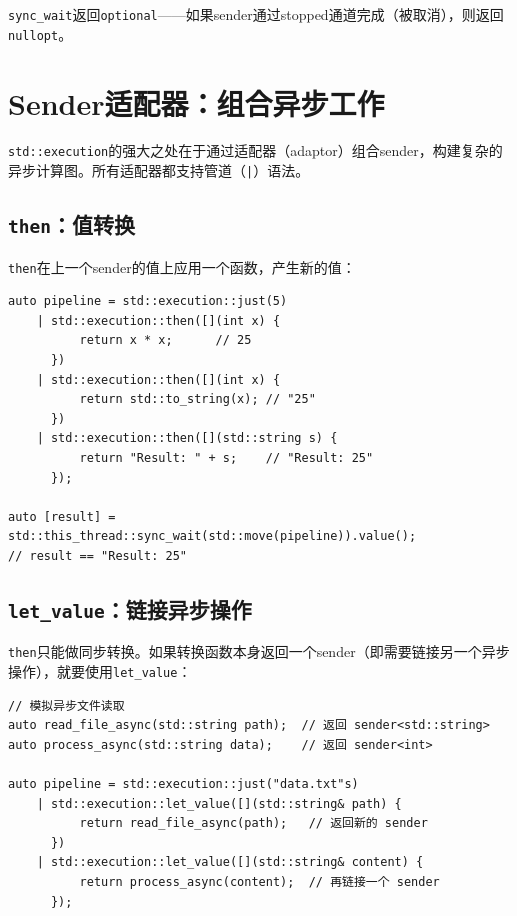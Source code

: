 \documentclass[12pt,a4paper,fontset=fandol]{ctexbook}
\begin{document}
\begin{note}
\texttt{sync\_wait}返回\texttt{optional}——如果sender通过stopped通道完成（被取消），则返回\texttt{nullopt}。
\end{note}

\chapter{Sender适配器：组合异步工作}

\texttt{std::execution}的强大之处在于通过适配器（adaptor）组合sender，构建复杂的异步计算图。所有适配器都支持管道（\texttt{|}）语法。

\section{\texttt{then}：值转换}

\texttt{then}在上一个sender的值上应用一个函数，产生新的值：

\begin{lstlisting}
auto pipeline = std::execution::just(5)
    | std::execution::then([](int x) {
          return x * x;      // 25
      })
    | std::execution::then([](int x) {
          return std::to_string(x); // "25"
      })
    | std::execution::then([](std::string s) {
          return "Result: " + s;    // "Result: 25"
      });

auto [result] = std::this_thread::sync_wait(std::move(pipeline)).value();
// result == "Result: 25"
\end{lstlisting}

\section{\texttt{let\_value}：链接异步操作}

\texttt{then}只能做同步转换。如果转换函数本身返回一个sender（即需要链接另一个异步操作），就要使用\texttt{let\_value}：

\begin{lstlisting}
// 模拟异步文件读取
auto read_file_async(std::string path);  // 返回 sender<std::string>
auto process_async(std::string data);    // 返回 sender<int>

auto pipeline = std::execution::just("data.txt"s)
    | std::execution::let_value([](std::string& path) {
          return read_file_async(path);   // 返回新的 sender
      })
    | std::execution::let_value([](std::string& content) {
          return process_async(content);  // 再链接一个 sender
      });
\end{lstlisting}
\end{document}
